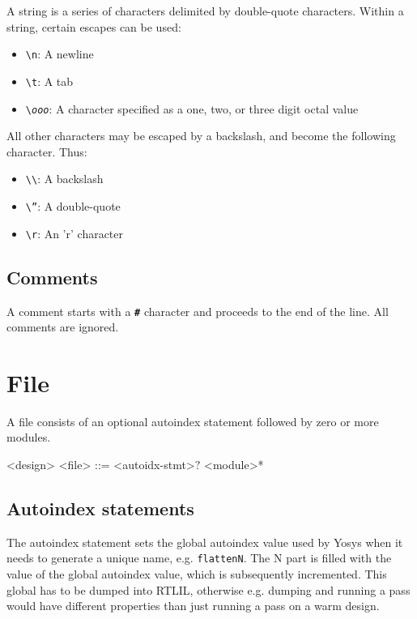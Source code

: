 A string is a series of characters delimited by double-quote characters. Within a string, certain escapes can be used:

\begin{itemize}
    \item \texttt{\textbackslash n}: A newline
    \item \texttt{\textbackslash t}: A tab
    \item \texttt{\textbackslash \textit{ooo}}: A character specified as a one, two, or three digit octal value
\end{itemize}

All other characters may be escaped by a backslash, and become the following character. Thus:

\begin{itemize}
    \item \texttt{\textbackslash \textbackslash}: A backslash
    \item \texttt{\textbackslash ''}: A double-quote
    \item \texttt{\textbackslash r}: An 'r' character
\end{itemize}

\subsection{Comments}

A comment starts with a \texttt{\textbf{\#}} character and proceeds to the end of the line. All comments are ignored.

\section{File}

A file consists of an optional autoindex statement followed by zero or more modules.

\begin{indentgrammar}{<design>}
<file> ::= <autoidx-stmt>$?$ <module>*
\end{indentgrammar}

\subsection{Autoindex statements}

The autoindex statement sets the global autoindex value used by Yosys when it needs to generate a unique name, e.g. \texttt{\textdollar{}flatten\textdollar{}N}. The N part is filled with the value of the global autoindex value, which is subsequently incremented. This global has to be dumped into RTLIL, otherwise e.g. dumping and running a pass would have different properties than just running a pass on a warm design.

